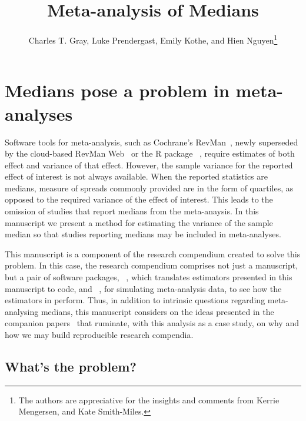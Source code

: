 \documentclass{article}
\title{Meta-analysis of Medians}
\author{Charles T. Gray, Luke Prendergast, Emily Kothe, and Hien Nguyen\thanks{
The authors are appreciative for the insights and comments from Kerrie Mengersen, and Kate Smith-Miles.
}}
\begin{document}
\maketitle


\begin{abstract}
\end{abstract}


\section{Medians pose a problem in meta-analyses}

Software tools for meta-analysis, such as Cochrane's
RevMan~\cite{reviewmanagerRevMan}, newly superseded by the cloud-based RevMan Web~\cite{reviewmanagerRevManWeb}
or the R package ~\cite{viechtbauerConductingMetaanalysesMetafor2010},
require estimates of both effect and variance
of that effect. However, the sample variance for the reported effect of interest is not always available.
When the reported statistics are medians, measure of spreads commonly provided are in the form of quartiles, as opposed to the required variance of the effect of interest. This leads to the omission of studies that report medians from the meta-anaysis. In this manuscript we present a method for estimating the variance of the sample median so that studies reporting medians may be included in meta-analyses.

This manuscript is a component of the research compendium created to solve this problem. In this case, the research compendium comprises not just a manuscript, but a pair of software packages, ~\cite{grayVarametaEstimatorsVariance2020}, which translates estimators presented in this manuscript to code, and ~\cite{graySimetaSimulateMetaanalysis2020}, for simulating meta-analysis data, to see how the estimators in  perform. Thus, in addition to intrinsic questions regarding meta-analysing medians, this manuscript considers on the ideas presented in the companion papers~\cite{gray2019textttcodeproof, grayTruthProofReproducibility2019} that ruminate, with this analysis as a case study, on why and how we may build reproducible research compendia.

\subsection{What's the problem?}
\end{document}
